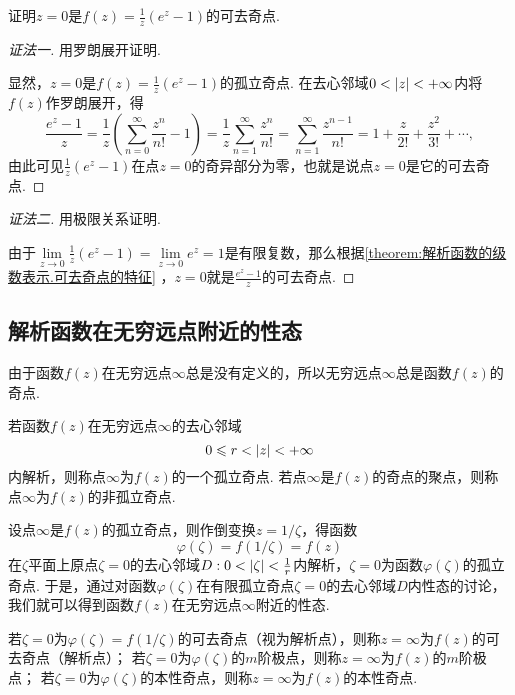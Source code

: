 \begin{example}
证明\(z=0\)是\(f(z) = \frac{1}{z} (e^z-1)\)的可去奇点.
\begin{proof}[证法一]
用罗朗展开证明.

显然，\(z=0\)是\(f(z) = \frac{1}{z} (e^z-1)\)的孤立奇点.
在去心邻域\(0<\abs{z}<+\infty\)内将\(f(z)\)作罗朗展开，得\[
\frac{e^z-1}{z}
= \frac{1}{z} \left( \sum\limits_{n=0}^{\infty} \frac{z^n}{n!} - 1 \right)
= \frac{1}{z} \sum\limits_{n=1}^{\infty} \frac{z^n}{n!}
= \sum\limits_{n=1}^{\infty} \frac{z^{n-1}}{n!}
= 1 + \frac{z}{2!} + \frac{z^2}{3!} + \dotsb,
\]由此可见\(\frac{1}{z} (e^z-1)\)在点\(z=0\)的奇异部分为零，也就是说点\(z=0\)是它的可去奇点.
\end{proof}
\begin{proof}[证法二]
用极限关系证明.

由于\(\lim\limits_{z\to0} \frac{1}{z} (e^z-1) = \lim\limits_{z\to0} e^z = 1\)是有限复数，那么根据\cref{theorem:解析函数的级数表示.可去奇点的特征} ，\(z=0\)就是\(\frac{e^z-1}{z}\)的可去奇点.
\end{proof}
\end{example}

\subsection{解析函数在无穷远点附近的性态}
由于函数\(f(z)\)在无穷远点\(\infty\)总是没有定义的，所以无穷远点\(\infty\)总是函数\(f(z)\)的奇点.

\begin{definition}
若函数\(f(z)\)在无穷远点\(\infty\)的去心邻域\[
0 \leqslant r < \abs{z} < +\infty
\]内解析，则称点\(\infty\)为\(f(z)\)的一个孤立奇点.
若点\(\infty\)是\(f(z)\)的奇点的聚点，则称点\(\infty\)为\(f(z)\)的非孤立奇点.
\end{definition}

设点\(\infty\)是\(f(z)\)的孤立奇点，则作倒变换\(z = 1/\zeta\)，得函数\[
\varphi(\zeta) = f(1/\zeta) = f(z)
\]在\(\zeta\)平面上原点\(\zeta=0\)的去心邻域\(D: 0<\abs{\zeta}<\frac{1}{r}\)内解析，\(\zeta=0\)为函数\(\varphi(\zeta)\)的孤立奇点.
于是，通过对函数\(\varphi(\zeta)\)在有限孤立奇点\(\zeta=0\)的去心邻域\(D\)内性态的讨论，我们就可以得到函数\(f(z)\)在无穷远点\(\infty\)附近的性态.
\begin{definition}\label{definition:解析函数的级数表示.无穷远处孤立奇点的分类}
若\(\zeta=0\)为\(\varphi(\zeta)=f(1/\zeta)\)的可去奇点（视为解析点），则称\(z=\infty\)为\(f(z)\)的可去奇点（解析点）；
若\(\zeta=0\)为\(\varphi(\zeta)\)的\(m\)阶极点，则称\(z=\infty\)为\(f(z)\)的\(m\)阶极点；
若\(\zeta=0\)为\(\varphi(\zeta)\)的本性奇点，则称\(z=\infty\)为\(f(z)\)的本性奇点.
\end{definition}

